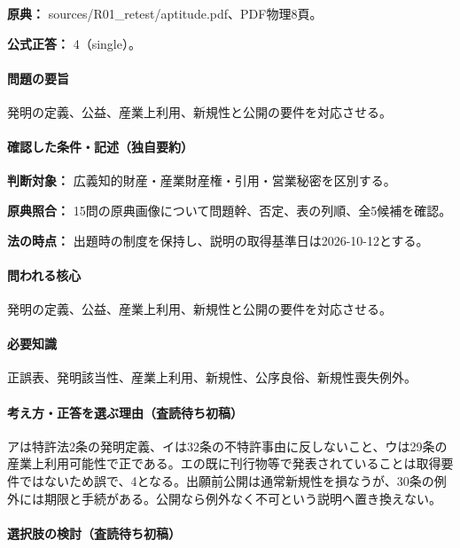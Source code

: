 \noindent\textbf{原典：} sources/R01\_retest/aptitude.pdf、PDF物理8頁。

\textbf{公式正答：} 4（single）。

\paragraph{問題の要旨} 発明の定義、公益、産業上利用、新規性と公開の要件を対応させる。

\paragraph{確認した条件・記述（独自要約）}\mbox{}\par

\noindent\textbf{判断対象：} 広義知的財産・産業財産権・引用・営業秘密を区別する。\par

\noindent\textbf{原典照合：} 15問の原典画像について問題幹、否定、表の列順、全5候補を確認。\par

\noindent\textbf{法の時点：} 出題時の制度を保持し、説明の取得基準日は2026-10-12とする。\par

\paragraph{問われる核心} 発明の定義、公益、産業上利用、新規性と公開の要件を対応させる。

\paragraph{必要知識} 正誤表、発明該当性、産業上利用、新規性、公序良俗、新規性喪失例外。

\paragraph{考え方・正答を選ぶ理由（査読待ち初稿）} アは特許法2条の発明定義、イは32条の不特許事由に反しないこと、ウは29条の産業上利用可能性で正である。エの既に刊行物等で発表されていることは取得要件ではないため誤で、4となる。出願前公開は通常新規性を損なうが、30条の例外には期限と手続がある。公開なら例外なく不可という説明へ置き換えない。

\paragraph{選択肢の検討（査読待ち初稿）}\mbox{}\par

